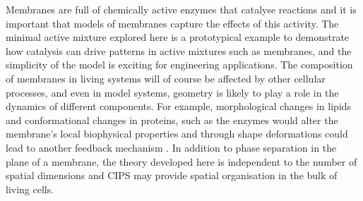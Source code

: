 Membranes are full of chemically active enzymes that catalyse reactions \cite{alberts_molecular_2008} and it is important that models of membranes capture the effects of this activity. The minimal active mixture explored here is a prototypical example to demonstrate how catalysis can drive patterns in active mixtures such as membranes, and the simplicity of the model is exciting for engineering applications. The composition of membranes in living systems will of course be affected by other cellular processes, and even in model systems, geometry is likely to play a role in the dynamics of different components. For example, morphological changes in lipids \cite{phan_switchable_2023} and conformational changes in proteins, such as the enzymes would alter the membrane's local biophysical properties and through shape deformations could lead to another feedback mechanism \cite{seifert_bilayer-spanning_2015}. In addition to phase separation in the plane of a membrane, the theory developed here is independent to the number of spatial dimensions and CIPS may provide spatial organisation in the bulk of living cells.